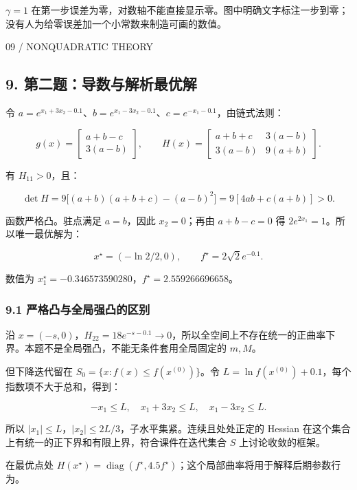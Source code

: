 \documentclass[10pt,a4paper]{article}
\newcommand{\eyebrow}[1]{{\sffamily\fontsize{8.3}{12}\selectfont\color{navy}#1}\par\vspace{4pt}{\color{navy}\hrule height 1pt}\vspace{12pt}}
\begin{document}
\(\gamma=1\)
在第一步误差为零，对数轴不能直接显示零。图中明确文字标注一步到零；没有人为给零误差加一个小常数来制造可画的数值。

\clearpage

\eyebrow{09 / NONQUADRATIC THEORY}

\subsection{9.
第二题：导数与解析最优解}\label{ux7b2cux4e8cux9898ux5bfcux6570ux4e0eux89e3ux6790ux6700ux4f18ux89e3}

令
\(a=e^{x_1+3x_2-0.1}\)、\(b=e^{x_1-3x_2-0.1}\)、\(c=e^{-x_1-0.1}\)，由链式法则：

\[g(x)=\begin{bmatrix}a+b-c\\3(a-b)\end{bmatrix},\qquad
H(x)=\begin{bmatrix}a+b+c&3(a-b)\\3(a-b)&9(a+b)\end{bmatrix}.\]

有 \(H_{11}>0\)，且：

\[\det H=9\big[(a+b)(a+b+c)-(a-b)^2\big]=9[4ab+c(a+b)]>0.\]

函数严格凸。驻点满足 \(a=b\)，因此 \(x_2=0\)；再由 \(a+b-c=0\) 得
\(2e^{2x_1}=1\)。所以唯一最优解为：

\[\boxed{x^\star=(-\ln2/2,0),\qquad f^\star=2\sqrt2e^{-0.1}.}\]

数值为 \(x_1^\star=-0.346573590280\)，\(f^\star=2.559266696658\)。

\subsubsection{9.1
严格凸与全局强凸的区别}\label{ux4e25ux683cux51f8ux4e0eux5168ux5c40ux5f3aux51f8ux7684ux533aux522b}

沿
\(x=(-s,0)\)，\(H_{22}=18e^{-s-0.1}\to0\)，所以全空间上不存在统一的正曲率下界。本题不是全局强凸，不能无条件套用全局固定的
\(m,M\)。

但下降迭代留在 \(S_0=\{x:f(x)\le f(x^{(0)})\}\)。令
\(L=\ln f(x^{(0)})+0.1\)，每个指数项不大于总和，得到：

\[-x_1\le L,\quad x_1+3x_2\le L,\quad x_1-3x_2\le L.\]

所以 \(|x_1|\le L\)，\(|x_2|\le2L/3\)，子水平集紧。连续且处处正定的
Hessian 在这个集合上有统一的正下界和有限上界，符合课件在迭代集合 \(S\)
上讨论收敛的框架。

在最优点处
\(H(x^\star)=\operatorname{diag}(f^\star,4.5f^\star)\)；这个局部曲率将用于解释后期参数行为。
\end{document}
